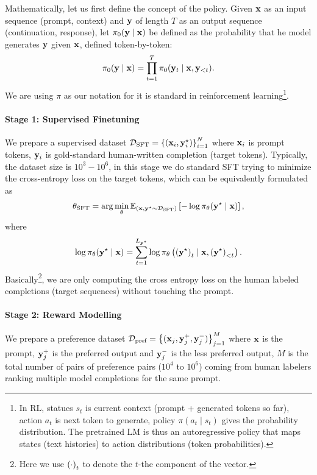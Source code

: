 \documentclass[11pt]{article}  %
\begin{document}
Mathematically, let us first define the concept of the policy.
Given $\mathbf{x}$ as an input sequence (prompt, context) and $\mathbf{y}$ of length $T$ as an output sequence (continuation, response), let $\pi_0(\mathbf{y} \mid \mathbf{x})$ be defined as the probability that he model generates $\mathbf{y}$ given $\mathbf{x}$, defined token-by-token:
\begin{align*}
  \pi_0(\mathbf{y} \mid \mathbf{x}) = \prod_{t=1}^T \pi_0(\mathbf{y}_t \mid \mathbf{x}, \mathbf{y}_{<t}).
\end{align*}
We are using $\pi$ as our notation for it is standard in reinforcement learning\footnote{In RL, statues $s_t$ is current context (prompt + generated tokens so far), action $a_t$ is next token to generate, policy $\pi(a_t \mid s_t)$ gives the probability distribution. The pretrained LM is thus an autoregressive policy that maps states (text histories) to action distributions (token probabilities).}.

\paragraph{Stage 1: Supervised Finetuning} We prepare a supervised dataset $\mathcal{D}_{\text{SFT}} = \left\{ (\mathbf{x}_i, \mathbf{y}_i^\star) \right\}_{i=1}^N$ where $\mathbf{x}_i$ is prompt tokens, $\mathbf{y}_i$ is gold-standard human-written completion (target tokens). 
Typically, the dataset size is $10^3 - 10^6$, in this stage we do standard SFT trying to minimize the cross-entropy loss on the target tokens, which can be equivalently formulated as 
\begin{align*}
  \theta_{\text{SFT}} = \arg\min_{\theta} \mathbb{E}_{(\mathbf{x}, \mathbf{y}^\star \sim \mathcal{D}_{\text{SFT}})}\left[- \log \pi_{\theta}(\mathbf{y}^\star \mid \mathbf{x})\right],
\end{align*}
where 
\begin{align*}
  \log \pi_{\theta}(\mathbf{y}^\star \mid \mathbf{x}) = \sum_{t=1}^{L_{\mathbf{y}^\star}}\log \pi_{\theta}\left( \left( \mathbf{y}^\star \right)_t \mid \mathbf{x},  \left( \mathbf{y}^\star \right)_{<t} \right).
\end{align*}
Basically\footnote{Here we use $\left( \cdot \right)_t$ to denote the $t$-the component of the vector.}, we are only computing the cross entropy loss on the human labeled completions (target sequences) without touching the prompt.


\paragraph{Stage 2: Reward Modelling} We prepare a preference dataset $\mathcal{D}_{\text{pref}} = \left\{ (\mathbf{x}_j, \mathbf{y}_j^+, \mathbf{y}_j^-) \right\}_{j=1}^M$ where $\mathbf{x}$ is the prompt, $\mathbf{y}_j^+$ is the preferred output and $\mathbf{y}_j^-$ is the less preferred output, $M$ is the total number of pairs of preference pairs ($10^4$ to $10^6$) coming from human labelers ranking multiple model completions for the same prompt.
\end{document}
